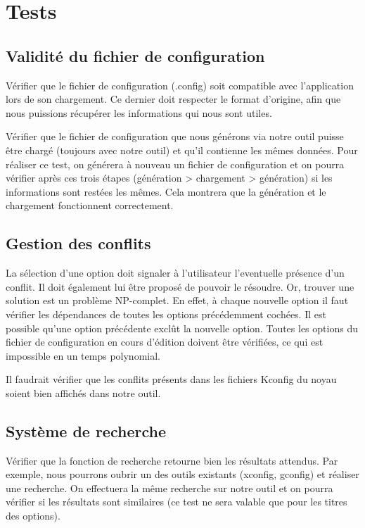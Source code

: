 \documentclass[16pts]{report}
\begin{document}
\chapter{Tests}
\label{cha:Tests}

\section{Validité du fichier de configuration}
\label{sec:Validité du fichier de configuration}

Vérifier que le fichier de configuration (.config) soit compatible avec
l'application lors de son chargement. Ce dernier doit respecter le format
d'origine, afin que nous puissions récupérer les informations qui nous sont
utiles.

Vérifier que le fichier de configuration que nous générons via notre outil
puisse être chargé (toujours avec notre outil) et qu'il contienne les mêmes
données. Pour réaliser ce test, on générera à nouveau un fichier de
configuration et on pourra vérifier après ces trois étapes (génération >
chargement > génération) si les informations sont restées les mêmes. Cela
montrera que la génération et le chargement fonctionnent correctement.


\section{Gestion des conflits}
\label{sec:Gestion des conflits}

La sélection d'une option doit signaler à l'utilisateur l'eventuelle présence
d'un conflit. Il doit également lui être proposé de pouvoir le résoudre. Or,
trouver une solution est un problème NP-complet. En effet, à chaque nouvelle
option il faut vérifier les dépendances de toutes les options précédemment
cochées. Il est possible qu'une option précédente exclût la nouvelle option.
Toutes les options du fichier de configuration en cours d'édition doivent être
vérifiées, ce qui est impossible en un temps polynomial.

Il faudrait vérifier que les conflits présents dans les fichiers Kconfig du
noyau soient bien affichés dans notre outil.


\section{Système de recherche}
\label{sec:Système de recherche}

Vérifier que la fonction de recherche retourne bien les résultats attendus.
Par exemple, nous pourrons oubrir un des outils existants (xconfig, gconfig) et
réaliser une recherche. On effectuera la même recherche sur notre outil et on
pourra vérifier si les résultats sont similaires (ce test ne sera valable que
pour les titres des options).
\end{document}
